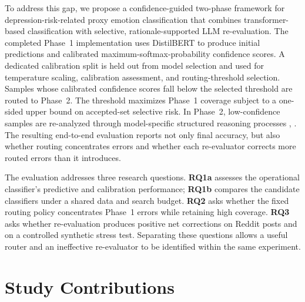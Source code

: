 \documentclass{ieeeaccess}
\begin{document}
To address this gap, we propose a confidence-guided two-phase framework for depression-risk-related proxy emotion classification that combines transformer-based classification with selective, rationale-supported LLM re-evaluation. The completed Phase~1 implementation uses DistilBERT to produce initial predictions and calibrated maximum-softmax-probability confidence scores. A dedicated calibration split is held out from model selection and used for temperature scaling, calibration assessment, and routing-threshold selection. Samples whose calibrated confidence scores fall below the selected threshold are routed to Phase~2. The threshold maximizes Phase~1 coverage subject to a one-sided upper bound on accepted-set selective risk. In Phase~2, low-confidence samples are re-analyzed through model-specific structured reasoning processes \cite{ref17}, \cite{ref18}. The resulting end-to-end evaluation reports not only final accuracy, but also whether routing concentrates errors and whether each re-evaluator corrects more routed errors than it introduces.

The evaluation addresses three research questions. \textbf{RQ1a} assesses the operational classifier's predictive and calibration performance; \textbf{RQ1b} compares the candidate classifiers under a shared data and search budget. \textbf{RQ2} asks whether the fixed routing policy concentrates Phase~1 errors while retaining high coverage. \textbf{RQ3} asks whether re-evaluation produces positive net corrections on Reddit posts and on a controlled synthetic stress test. Separating these questions allows a useful router and an ineffective re-evaluator to be identified within the same experiment.

\section{Study Contributions}
\end{document}
